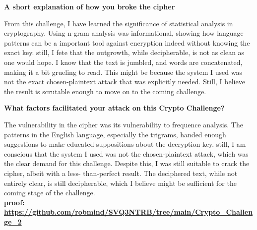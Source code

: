 \documentclass[12pt]{amsart}
\begin{document}
{\bf A short explanation of how you broke the cipher}

\bigskip

From this challenge, I have learned the significance of statistical analysis in cryptography. Using n-gram analysis was informational, showing how language patterns can be a important tool against encryption indeed without knowing the exact key. still, I fete that the outgrowth, while decipherable, is not as clean as one would hope. I know that the text is jumbled, and words are concatenated, making it a bit grueling to read. This might be because the system I used was not the exact chosen-plaintext attack that was explicitly needed. Still, I believe the result is scrutable enough to move on to the coming challenge.\\
\bigskip

{\bf What factors facilitated your attack on this Crypto Challenge?}

\bigskip

The vulnerability in the cipher was its vulnerability to frequence analysis. The patterns in the English language, especially the trigrams, handed enough suggestions to make educated suppositions about the decryption key. still, I am conscious that the system I used was not the chosen-plaintext attack, which was the clear demand for this challenge. Despite this, I was still suitable to crack the cipher, albeit with a less- than-perfect result. The deciphered text, while not entirely clear, is still decipherable, which I believe might be sufficient for the coming stage of the challenge.\\

{\bf proof: \url{https://github.com/robmind/SVQ3NTRB/tree/main/Crypto_Challenge_2}}


\bigskip
\end{document}
